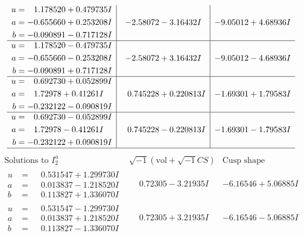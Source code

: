 \documentclass[1p]{elsarticle_modified}
\theoremstyle{definition}
\newcommand{\I}{\sqrt{-1}}
\begin{document}
$$\begin{array}{c|c|c}
\begin{aligned}
u &= \phantom{-}1.178520 + 0.479735 I \\
a &= -0.655660 + 0.253208 I \\
b &= -0.090891 - 0.717128 I\end{aligned}
 & -2.58072 - 3.16432 I & -9.05012 + 4.68936 I \\ \hline\begin{aligned}
u &= \phantom{-}1.178520 - 0.479735 I \\
a &= -0.655660 - 0.253208 I \\
b &= -0.090891 + 0.717128 I\end{aligned}
 & -2.58072 + 3.16432 I & -9.05012 - 4.68936 I \\ \hline\begin{aligned}
u &= \phantom{-}0.692730 + 0.052899 I \\
a &= \phantom{-}1.72978 + 0.41261 I \\
b &= -0.232122 - 0.090819 I\end{aligned}
 & \phantom{-}0.745228 + 0.220813 I & -1.69301 + 1.79583 I \\ \hline\begin{aligned}
u &= \phantom{-}0.692730 - 0.052899 I \\
a &= \phantom{-}1.72978 - 0.41261 I \\
b &= -0.232122 + 0.090819 I\end{aligned}
 & \phantom{-}0.745228 - 0.220813 I & -1.69301 - 1.79583 I\\
 \hline 
 \end{array}$$\newpage$$\begin{array}{c|c|c}  
\text{Solutions to }I^u_{2}& \I (\text{vol} + \sqrt{-1}CS) & \text{Cusp shape}\\
 \hline 
\begin{aligned}
u &= \phantom{-}0.531547 + 1.299730 I \\
a &= \phantom{-}0.013837 - 1.218520 I \\
b &= \phantom{-}0.113827 + 1.336070 I\end{aligned}
 & \phantom{-}0.72305 - 3.21935 I & -6.16546 + 5.06885 I \\ \hline\begin{aligned}
u &= \phantom{-}0.531547 - 1.299730 I \\
a &= \phantom{-}0.013837 + 1.218520 I \\
b &= \phantom{-}0.113827 - 1.336070 I\end{aligned}
 & \phantom{-}0.72305 + 3.21935 I & -6.16546 - 5.06885 I \\ \hline\begin{aligned}

\end{aligned}
\end{array}$$
\end{document}
